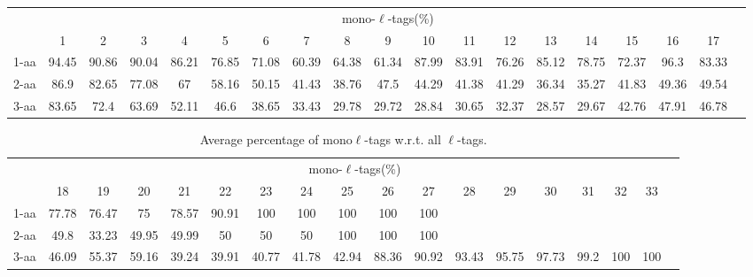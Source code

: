 \documentclass{article}
\begin{document}
\begin{table}[h]\tiny
\vspace{3mm}
{\centering
\begin{center}
\begin{tabular}{|l|c|c|c|c|c|c|c|c|c|c|c|c|c|c|c|c|c|c|}
  \hline
  & \multicolumn{ 17 }{|c|}{mono-$\ell$-tags(\%)} \\
  \cline{2- 18}
    & 1 & 2 & 3 & 4 & 5 & 6 & 7 & 8 & 9 & 10 & 11 & 12 & 13 & 14 & 15 & 16 & 17\\
  \hline
1-aa  & 94.45 & 90.86 & 90.04 & 86.21 & 76.85 & 71.08 & 60.39 & 64.38 & 61.34 & 87.99 & 83.91 & 76.26 & 85.12 & 78.75 & 72.37 & 96.3 & 83.33\\
2-aa  & 86.9 & 82.65 & 77.08 & 67 & 58.16 & 50.15 & 41.43 & 38.76 & 47.5 & 44.29 & 41.38 & 41.29 & 36.34 & 35.27 & 41.83 & 49.36 & 49.54\\
3-aa  & 83.65 & 72.4 & 63.69 & 52.11 & 46.6 & 38.65 & 33.43 & 29.78 & 29.72 & 28.84 & 30.65 & 32.37 & 28.57 & 29.67 & 42.76 & 47.91 & 46.78\\
 \hline
\end{tabular}
\end{center}
\par}
\centering

\vspace{3mm}
\label{table:table7}
\end{table}
\begin{table}[h]\tiny
\vspace{3mm}
{\centering
\begin{center}
\begin{tabular}{|l|c|c|c|c|c|c|c|c|c|c|c|c|c|c|c|c|c|}
  \hline
  & \multicolumn{ 16 }{|c|}{mono-$\ell$-tags(\%)} \\
  \cline{2- 17}
    & 18 & 19 & 20 & 21 & 22 & 23 & 24 & 25 & 26 & 27 & 28 & 29 & 30 & 31 & 32 & 33\\
  \hline
1-aa  & 77.78 & 76.47 & 75 & 78.57 & 90.91 & 100 & 100 & 100 & 100 & 100 &  &  &  &  &  & \\
2-aa  & 49.8 & 33.23 & 49.95 & 49.99 & 50 & 50 & 50 & 100 & 100 & 100 &  &  &  &  &  & \\
3-aa  & 46.09 & 55.37 & 59.16 & 39.24 & 39.91 & 40.77 & 41.78 & 42.94 & 88.36 & 90.92 & 93.43 & 95.75 & 97.73 & 99.2 & 100 & 100\\
 \hline
\end{tabular}
\end{center}
\par}
\centering

\caption{ Average percentage of mono$\ell$-tags w.r.t. all $\ell$-tags.}

\vspace{3mm}
\label{table:table7}
\end{table}
\end{document}
